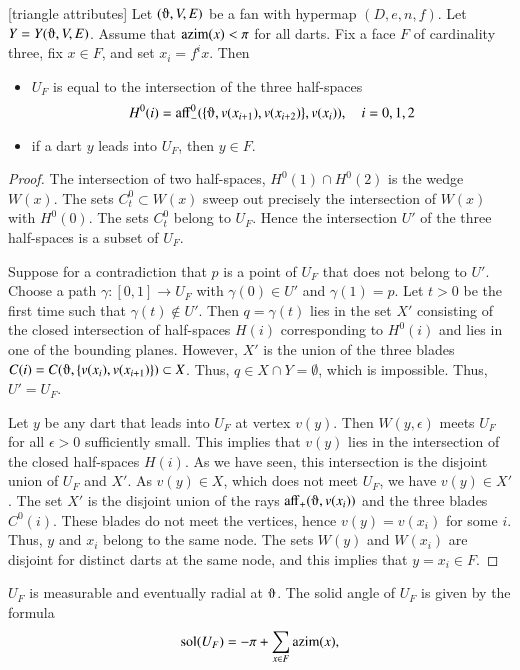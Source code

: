 \begin{lemma}[triangle attributes] \label{lemma:triangle}
Let $(\orgn,V,E)$ be a fan with hypermap $(D,e,n,f)$. 
Let $Y=Y(\orgn,V,E)$.
Assume that ${\operatorname{azim}}(x)<\pi$
for all darts.  Fix a face $F$ of cardinality three, fix
$x\in F$, and set $x_i = f^i x$. Then
\begin{itemize}  
\item $U_F$ is equal to the intersection of the three half-spaces
$$H^0(i)=\op{aff}_-^0(\{\orgn,v(x_{i+1}),v(x_{i+2})\},v(x_i)),\quad i=0,1,2$$
\item if a dart $y$ leads into $U_F$, then $y\in F$.
\end{itemize}
\end{lemma}

\begin{proof} The intersection of two half-spaces, $H^0(1)\cap H^0(2)$ is
the wedge $W(x)$.   The sets $C^0_t\subset W(x)$ sweep out precisely
the intersection of $W(x)$ with $H^0(0)$.  The sets $C^0_t$ belong to
$U_F$.  Hence the intersection $U'$ of the three half-spaces is a subset of $U_F$.

Suppose for a contradiction 
that $p$ is a point of $U_F$ that does not belong to $U'$.  Choose a path $\gamma:[0,1]\to U_F$ with $\gamma(0)\in U'$ and $\gamma(1)=p$.  Let $t>0$ be the first time such that $\gamma(t)\not\in U'$.  Then $q=\gamma(t)$ lies
in the set $X'$ consisting of the closed intersection of half-spaces $H(i)$
corresponding to $H^0(i)$ and lies
in one of the bounding planes.  However, $X'$ is the union of the three
blades $C(i)=C(\orgn,\{v(x_i),v(x_{i+1})\})\subset X$.  Thus,
$q\in X\cap Y = \emptyset$, which is impossible.  Thus, $U'=U_F$.

Let $y$ be any dart that leads into $U_F$ at vertex $v(y)$.  Then
$W(y,\epsilon)$ meets $U_F$ for all $\epsilon>0$ sufficiently small.
This implies that $v(y)$ lies in the intersection of the closed half-spaces $H(i)$.  As we have seen, this intersection is the disjoint union of $U_F$ and
$X'$.  As $v(y)\in X$, which does not meet $U_F$, we have $v(y)\in X'$.
The set $X'$ is the disjoint union of the rays $\op{aff}_+(\orgn,v(x_i))$ and
the three blades $C^0(i)$.  These blades do not meet the vertices, hence
$v(y)=v(x_i)$ for some $i$.  Thus, $y$ and $x_i$ belong to the same
node.  The sets $W(y)$ and $W( x_i)$ are disjoint for distinct darts at the same
node, and this implies that $y=x_i\in F$.
\end{proof}

\begin{corollary}\label{lemma:girard-component}
$U_F$ is measurable and eventually radial at $\orgn$.
The solid angle of $U_F$ is given by the formula
$$
\operatorname{sol}(U_F) = -\pi + \sum_{x\in F}{\operatorname{azim}}(x),
$$
\end{corollary}

